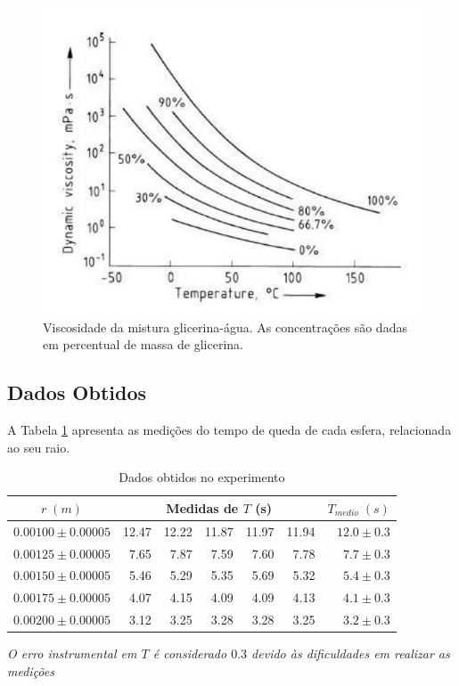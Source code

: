 \documentclass[12pt,a4paper]{article}
\begin{document}
\begin{figure}
\centering
\includegraphics[scale=0.4]{Fig5-2.jpg}
\caption{Viscosidade da mistura glicerina-água. As concentrações
são dadas em percentual de massa de glicerina.}
\label{porcentagem}
\end{figure}

\subsection{Dados Obtidos}

A Tabela \ref{dados} apresenta as medições do tempo de queda de cada esfera, relacionada ao seu raio.

\begin{table}[!htbp]

\centering
\def\arraystretch{1.5}
\caption{Dados obtidos no experimento}

\begin{tabular}{|c|rrrrr|r|}
\hline
$ r \; (m)$ & \multicolumn{5}{c|}{Medidas de $T$ \;  (s)} & $T_{medio} \; (s)$  \\
\hline
  $ 0.00100 \pm 0.00005 $ &12.47 & 12.22 & 11.87 & 11.97 & 11.94 & $ 12.0 \pm 0.3 $ \\
  \hline
  $ 0.00125 \pm 0.00005 $ &7.65 & 7.87 & 7.59 & 7.60 & 7.78  & $ 7.7 \pm 0.3 $   \\
  \hline
  $ 0.00150 \pm 0.00005 $ &5.46 & 5.29 & 5.35 & 5.69 & 5.32 & $ 5.4 \pm 0.3 $     \\
  \hline
  $ 0.00175 \pm 0.00005 $ &4.07 & 4.15 & 4.09 & 4.09 & 4.13  & $ 4.1 \pm 0.3 $    \\
  \hline
  $ 0.00200 \pm 0.00005 $ &3.12 & 3.25 & 3.28 & 3.28 & 3.25 & $ 3.2 \pm 0.3 $       \\
\hline
\end{tabular}

\emph{O erro instrumental em $T$ é considerado $0.3$ devido às dificuldades em realizar as medições}
\label{dados}
\end{table}
\end{document}
